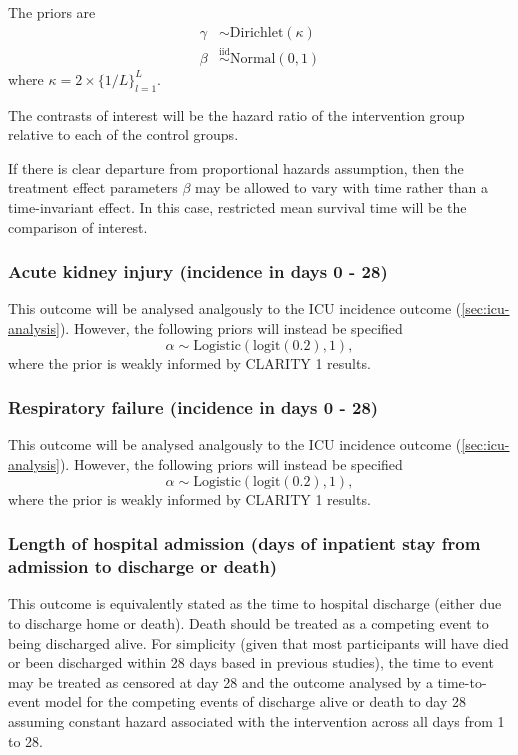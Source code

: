 \documentclass[11pt,parskip=half-]{scrartcl}
\begin{document}
The priors are
$$
\begin{aligned}
    \gamma & \sim \text{Dirichlet}(\kappa) \\
    \beta  & \overset{\text{iid}}{\sim} \text{Normal}(0, 1)
\end{aligned}
$$
where $\kappa = 2\times\{1/L\}_{l=1}^L$.

The contrasts of interest will be the hazard ratio of the intervention group relative to each of the control groups.

If there is clear departure from proportional hazards assumption, then the treatment effect parameters $\beta$ may be allowed to vary with time rather than a time-invariant effect. In this case, restricted mean survival time will be the comparison of interest.

\subsubsection{Acute kidney injury (incidence in days 0 - 28)}
This outcome will be analysed analgously to the ICU incidence outcome (\ref{sec:icu-analysis}). However, the following priors will instead be specified
$$
    \alpha \sim \text{Logistic}(\text{logit}(0.2), 1),
$$
where the prior is weakly informed by CLARITY 1 results.

\subsubsection{Respiratory failure (incidence in days 0 - 28)}
This outcome will be analysed analgously to the ICU incidence outcome (\ref{sec:icu-analysis}). However, the following priors will instead be specified
$$
    \alpha \sim \text{Logistic}(\text{logit}(0.2), 1),
$$
where the prior is weakly informed by CLARITY 1 results.

\subsubsection{Length of hospital admission (days of inpatient stay from admission to discharge or death)}

This outcome is equivalently stated as the time to hospital discharge (either due to discharge home or death). Death should be treated as a competing event to being discharged alive. For simplicity (given that most participants will have died or been discharged within 28 days based in previous studies), the time to event may be treated as censored at day 28 and the outcome analysed by a time-to-event model for the competing events of discharge alive or death to day 28 assuming constant hazard associated with the intervention across all days from 1 to 28.
\end{document}
